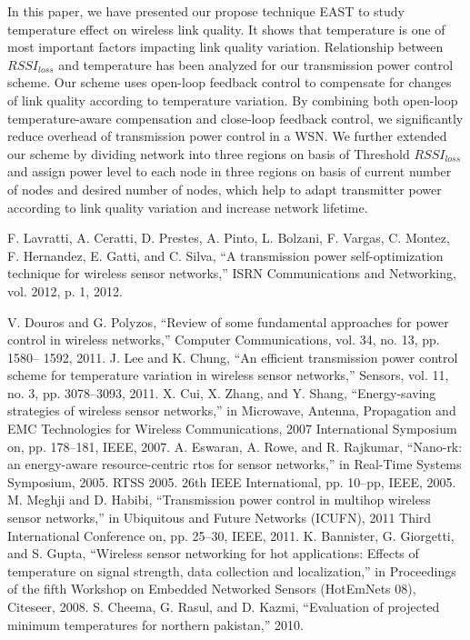 \documentclass{article}
\begin{document}
In this paper, we have presented  our propose technique  EAST to study temperature effect on wireless link quality. It shows that temperature is one of most important factors impacting link quality variation. Relationship between $RSSI_{loss}$ and temperature has been analyzed for our transmission power control scheme. Our scheme uses open-loop feedback control to compensate for changes of link quality according to temperature variation. By combining both open-loop temperature-aware compensation and close-loop feedback control, we significantly reduce overhead of transmission power control in a WSN. We  further extended our scheme by dividing network into three regions on basis of Threshold $RSSI_{loss}$ and assign power level to each node in three regions on basis of current number of nodes and desired number of nodes, which help to adapt transmitter power according to link quality variation and increase network lifetime.

\begin{thebibliography}{00}

 F. Lavratti, A. Ceratti, D. Prestes, A. Pinto, L. Bolzani, F. Vargas, C. Montez, F. Hernandez, E. Gatti, and C. Silva, “A transmission power self-optimization technique for wireless sensor networks,” ISRN Communications and Networking, vol. 2012, p. 1, 2012.
    
 V. Douros and G. Polyzos, “Review of some fundamental
approaches for power control in wireless networks,”
Computer Communications, vol. 34, no. 13, pp. 1580–
1592, 2011.
 J. Lee and K. Chung, “An efficient transmission power
control scheme for temperature variation in wireless sensor
networks,” Sensors, vol. 11, no. 3, pp. 3078–3093,
2011.
 X. Cui, X. Zhang, and Y. Shang, “Energy-saving strategies
of wireless sensor networks,” in Microwave, Antenna,
Propagation and EMC Technologies for Wireless
Communications, 2007 International Symposium on,
pp. 178–181, IEEE, 2007.
 A. Eswaran, A. Rowe, and R. Rajkumar, “Nano-rk: an
energy-aware resource-centric rtos for sensor networks,”
in Real-Time Systems Symposium, 2005. RTSS 2005. 26th
IEEE International, pp. 10–pp, IEEE, 2005.
 M. Meghji and D. Habibi, “Transmission power control
in multihop wireless sensor networks,” in Ubiquitous
and Future Networks (ICUFN), 2011 Third International
Conference on, pp. 25–30, IEEE, 2011.
 K. Bannister, G. Giorgetti, and S. Gupta, “Wireless sensor
networking for hot applications: Effects of temperature
on signal strength, data collection and localization,”
in Proceedings of the fifth Workshop on Embedded Networked
Sensors (HotEmNets 08), Citeseer, 2008.
 S. Cheema, G. Rasul, and D. Kazmi, “Evaluation of
projected minimum temperatures for northern pakistan,”
2010.
\end{thebibliography}
\end{document}
